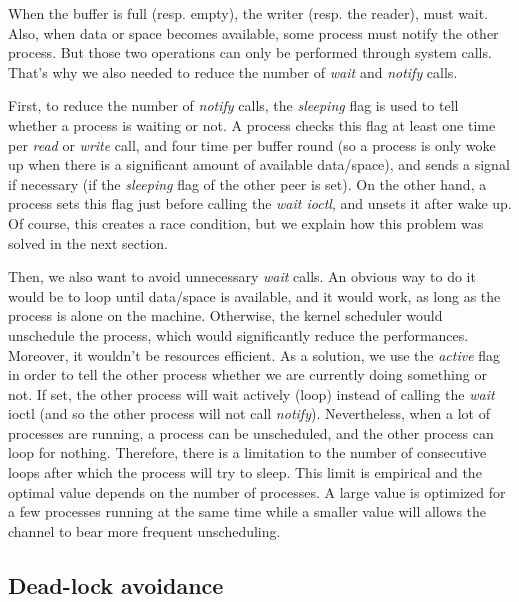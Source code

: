 \documentclass[journal]{IEEEtran}
\begin{document}
When the buffer is full (resp. empty), the writer (resp. the reader), must wait. Also, when data or space becomes available, some process must notify the other process. But those two operations can only be performed through system calls. That's why we also needed to reduce the number of \emph{wait} and \emph{notify} calls. 

First, to reduce the number of \emph{notify} calls, the \emph{sleeping} flag is used to tell whether a process is waiting or not. A process checks this flag at least one time per \emph{read} or \emph{write} call, and four time per buffer round (so a process is only woke up when there is a significant amount of available data/space), and sends a signal if necessary (if the \emph{sleeping} flag of the other peer is set).
On the other hand, a process sets this flag just before calling the \emph{wait ioctl}, and unsets it after wake up. Of course, this creates a race condition, but we explain how this problem was solved in the next section.

Then, we also want to avoid unnecessary \emph{wait} calls. An obvious way to do it would be to loop until data/space is available, and it would work, as long as the process is alone on the machine. Otherwise, the kernel scheduler would unschedule the process, which would significantly reduce the performances. Moreover, it wouldn't be resources efficient.
As a solution, we use the \emph{active} flag in order to tell the other process whether we are currently doing something or not.
If set, the other process will wait actively (loop) instead of calling the \emph{wait} ioctl (and so the other process will not call \emph{notify}). Nevertheless, when a lot of processes are running, a process can be unscheduled, and the other process can loop for nothing. Therefore, there is a limitation to the number of consecutive loops after which the process will try to sleep. This limit is empirical and the optimal value depends on the number of processes. A large value is optimized for a few processes running at the same time while a smaller value will allows the channel to bear more frequent unscheduling.  

\subsection{Dead-lock avoidance}
\end{document}
